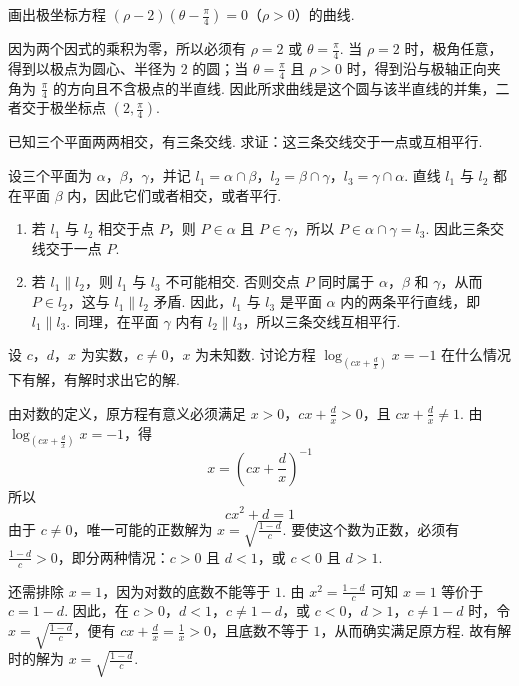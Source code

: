 \begin{problem}

画出极坐标方程 \((\rho - 2)\left(\theta - \frac{\pi}{4}\right) = 0\)（\(\rho > 0\)）的曲线.
\end{problem}

\begin{solution}
因为两个因式的乘积为零，所以必须有 \(\rho=2\) 或 \(\theta=\frac{\pi}{4}\). 当 \(\rho=2\) 时，极角任意，得到以极点为圆心、半径为 \(2\) 的圆；当 \(\theta=\frac{\pi}{4}\) 且 \(\rho>0\) 时，得到沿与极轴正向夹角为 \(\frac{\pi}{4}\) 的方向且不含极点的半直线. 因此所求曲线是这个圆与该半直线的并集，二者交于极坐标点 \(\left(2,\frac{\pi}{4}\right)\).
\end{solution}

\begin{problem}

已知三个平面两两相交，有三条交线. 求证：这三条交线交于一点或互相平行.
\end{problem}

\begin{solution}
设三个平面为 \(\alpha\)，\(\beta\)，\(\gamma\)，并记 \(l_1=\alpha\cap\beta\)，\(l_2=\beta\cap\gamma\)，\(l_3=\gamma\cap\alpha\). 直线 \(l_1\) 与 \(l_2\) 都在平面 \(\beta\) 内，因此它们或者相交，或者平行.

\begin{enumerate}
\item 若 \(l_1\) 与 \(l_2\) 相交于点 \(P\)，则 \(P\in\alpha\) 且 \(P\in\gamma\)，所以 \(P\in\alpha\cap\gamma=l_3\). 因此三条交线交于一点 \(P\).
\item 若 \(l_1\parallel l_2\)，则 \(l_1\) 与 \(l_3\) 不可能相交. 否则交点 \(P\) 同时属于 \(\alpha\)，\(\beta\) 和 \(\gamma\)，从而 \(P\in l_2\)，这与 \(l_1\parallel l_2\) 矛盾. 因此，\(l_1\) 与 \(l_3\) 是平面 \(\alpha\) 内的两条平行直线，即 \(l_1\parallel l_3\). 同理，在平面 \(\gamma\) 内有 \(l_2\parallel l_3\)，所以三条交线互相平行.
\end{enumerate}
\end{solution}

\begin{problem}

设 \(c\)，\(d\)，\(x\) 为实数，\(c \neq 0\)，\(x\) 为未知数. 讨论方程 \(\log_{\left(cx + \frac{d}{x}\right)} x = -1\) 在什么情况下有解，有解时求出它的解.
\end{problem}

\begin{solution}
由对数的定义，原方程有意义必须满足 \(x>0\)，\(cx+\frac{d}{x}>0\)，且 \(cx+\frac{d}{x}\neq1\). 由 \(\log_{\left(cx+\frac{d}{x}\right)}x=-1\)，得
\[
x=\left(cx+\frac{d}{x}\right)^{-1}
\]
所以
\[
cx^2+d=1
\]
由于 \(c\neq0\)，唯一可能的正数解为 \(x=\sqrt{\frac{1-d}{c}}\). 要使这个数为正数，必须有 \(\frac{1-d}{c}>0\)，即分两种情况：\(c>0\) 且 \(d<1\)，或 \(c<0\) 且 \(d>1\).

还需排除 \(x=1\)，因为对数的底数不能等于 \(1\). 由 \(x^2=\frac{1-d}{c}\) 可知 \(x=1\) 等价于 \(c=1-d\). 因此，在 \(c>0\)，\(d<1\)，\(c\neq1-d\)，或 \(c<0\)，\(d>1\)，\(c\neq1-d\) 时，令 \(x=\sqrt{\frac{1-d}{c}}\)，便有 \(cx+\frac{d}{x}=\frac{1}{x}>0\)，且底数不等于 \(1\)，从而确实满足原方程. 故有解时的解为 \(x=\sqrt{\frac{1-d}{c}}\).
\end{solution}


